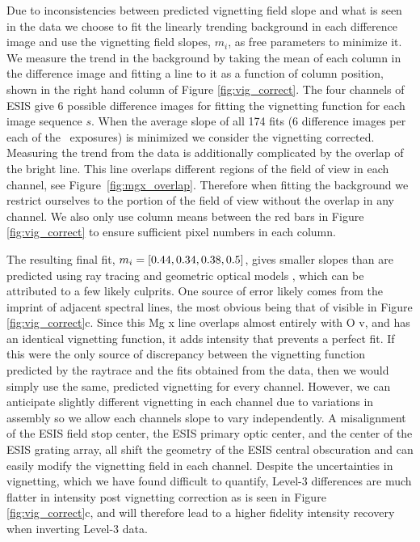         Due to inconsistencies between predicted vignetting field slope and what is seen in the data we choose to fit the linearly trending background in each difference image and use the vignetting field slopes, $m_i$, as free parameters to minimize it.
        We measure the trend in the background by taking the mean of each column in the difference image and fitting a line to it as a function of column position, shown in the right hand column of Figure \ref{fig:vig_correct}.
        The four channels of ESIS give 6 possible difference images for fitting the vignetting function for each image sequence $s$. 
        When the average slope of all 174 fits (6 difference images per each of the \numDataFrames \ exposures) is minimized we consider the vignetting corrected.
        Measuring the trend from the data is additionally complicated by the overlap of the bright \mgxbright line.  
        This line overlaps different regions of the field of view in each channel, see Figure~\ref{fig:mgx_overlap}.  
        Therefore when fitting the background we restrict ourselves to the portion of the field of view without the \mgxbright overlap in any channel.
        We also only use column means between the red bars in Figure \ref{fig:vig_correct} to ensure sufficient pixel numbers in each column.  
        
        The resulting final fit, $m_i = [0.44, 0.34, 0.38, 0.5]$, gives smaller slopes than are predicted using ray tracing and geometric optical models \citep{ESIS}, which can be attributed to a few likely culprits. 
        One source of error likely comes from the imprint of adjacent spectral lines, the most obvious being that of \mgxdim visible in Figure \ref{fig:vig_correct}c.
        Since this Mg {\sc x} line overlaps almost entirely with O {\sc v}, and has an identical vignetting function, it adds intensity that prevents a perfect fit. 
        If this were the only source of discrepancy between the vignetting function predicted by the raytrace and the fits obtained from the data, then we would simply use the same, predicted vignetting for every channel. 
        However, we can anticipate slightly different vignetting in each channel due to variations in assembly so we allow each channels slope to vary independently.
        A misalignment of the ESIS field stop center, the ESIS primary optic center, and the center of the ESIS grating array, all shift the geometry of the ESIS central obscuration and can easily modify the vignetting field in each channel.
        Despite the uncertainties in vignetting, which we have found difficult to quantify, Level-3 differences are much flatter in intensity post vignetting correction as is seen in Figure \ref{fig:vig_correct}c, and will therefore lead to a higher fidelity intensity recovery when inverting Level-3 data.


